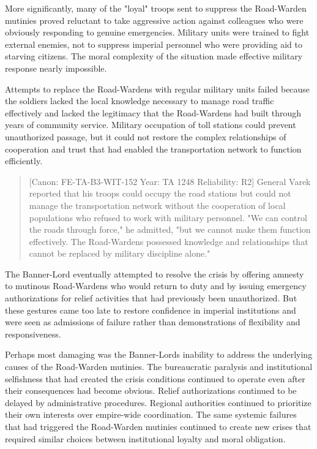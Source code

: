 More significantly, many of the "loyal" troops sent to suppress the
Road-Warden mutinies proved reluctant to take aggressive action against
colleagues who were obviously responding to genuine emergencies.
Military units were trained to fight external enemies, not to suppress
imperial personnel who were providing aid to starving citizens. The
moral complexity of the situation made effective military response
nearly impossible.

Attempts to replace the Road-Wardens with regular military units failed
because the soldiers lacked the local knowledge necessary to manage road
traffic effectively and lacked the legitimacy that the Road-Wardens had
built through years of community service. Military occupation of toll
stations could prevent unauthorized passage, but it could not restore
the complex relationships of cooperation and trust that had enabled the
transportation network to function efficiently.

\begin{quote}
{[}Canon: FE-TA-B3-WIT-152 \textbar{} Year: TA 1248 \textbar{}
Reliability: R2{]} General Varek reported that his troops could occupy
the road stations but could not manage the transportation network
without the cooperation of local populations who refused to work with
military personnel. "We can control the roads through force," he
admitted, "but we cannot make them function effectively. The
Road-Wardens possessed knowledge and relationships that cannot be
replaced by military discipline alone."
\end{quote}

The Banner-Lord eventually attempted to resolve the crisis by offering
amnesty to mutinous Road-Wardens who would return to duty and by issuing
emergency authorizations for relief activities that had previously been
unauthorized. But these gestures came too late to restore confidence in
imperial institutions and were seen as admissions of failure rather than
demonstrations of flexibility and responsiveness.

Perhaps most damaging was the Banner-Lord\textquotesingle s inability to
address the underlying causes of the Road-Warden mutinies. The
bureaucratic paralysis and institutional selfishness that had created
the crisis conditions continued to operate even after their consequences
had become obvious. Relief authorizations continued to be delayed by
administrative procedures. Regional authorities continued to prioritize
their own interests over empire-wide coordination. The same systemic
failures that had triggered the Road-Warden mutinies continued to create
new crises that required similar choices between institutional loyalty
and moral obligation.

